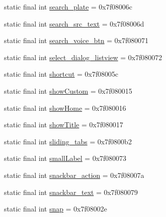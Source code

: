 \begin{CompactItemize}
\item 
static final int \hyperlink{classandroid_1_1support_1_1graphics_1_1drawable_1_1animated_1_1_r_1_1id_6997e25f73ca24918535023752db0511}{search\_\-plate} = 0x7f08006c
\item 
static final int \hyperlink{classandroid_1_1support_1_1graphics_1_1drawable_1_1animated_1_1_r_1_1id_ce41ffd4ea58699109ed57a16e101332}{search\_\-src\_\-text} = 0x7f08006d
\item 
static final int \hyperlink{classandroid_1_1support_1_1graphics_1_1drawable_1_1animated_1_1_r_1_1id_0fd1e7f1951c3a751b79f362da974d36}{search\_\-voice\_\-btn} = 0x7f080071
\item 
static final int \hyperlink{classandroid_1_1support_1_1graphics_1_1drawable_1_1animated_1_1_r_1_1id_cd1b499d9ea6a1d061cf0e2ce5c9f5ef}{select\_\-dialog\_\-listview} = 0x7f080072
\item 
static final int \hyperlink{classandroid_1_1support_1_1graphics_1_1drawable_1_1animated_1_1_r_1_1id_f76a09b375dbdf9be2a5e6db14c35df7}{shortcut} = 0x7f08005c
\item 
static final int \hyperlink{classandroid_1_1support_1_1graphics_1_1drawable_1_1animated_1_1_r_1_1id_279b1c99c9fcd8931b8d2c364fa77551}{showCustom} = 0x7f080015
\item 
static final int \hyperlink{classandroid_1_1support_1_1graphics_1_1drawable_1_1animated_1_1_r_1_1id_3782596f3e9c0c7dc9721d3fad6e473e}{showHome} = 0x7f080016
\item 
static final int \hyperlink{classandroid_1_1support_1_1graphics_1_1drawable_1_1animated_1_1_r_1_1id_55eedd3753213be1b0651c87d74f706c}{showTitle} = 0x7f080017
\item 
static final int \hyperlink{classandroid_1_1support_1_1graphics_1_1drawable_1_1animated_1_1_r_1_1id_2c6fee4ee0bcf82f1c0c4e5c0804238c}{sliding\_\-tabs} = 0x7f0800b2
\item 
static final int \hyperlink{classandroid_1_1support_1_1graphics_1_1drawable_1_1animated_1_1_r_1_1id_8f1e16983da68ee2b04ef513f723ea26}{smallLabel} = 0x7f080073
\item 
static final int \hyperlink{classandroid_1_1support_1_1graphics_1_1drawable_1_1animated_1_1_r_1_1id_bd962eb5eb8a0febf32ca835a645b242}{snackbar\_\-action} = 0x7f08007a
\item 
static final int \hyperlink{classandroid_1_1support_1_1graphics_1_1drawable_1_1animated_1_1_r_1_1id_c84371d25b4efb8e93085f8ce5584ce1}{snackbar\_\-text} = 0x7f080079
\item 
static final int \hyperlink{classandroid_1_1support_1_1graphics_1_1drawable_1_1animated_1_1_r_1_1id_27d9db6be4ab032b12d97e808c4ad171}{snap} = 0x7f08002e

\end{CompactItemize}
